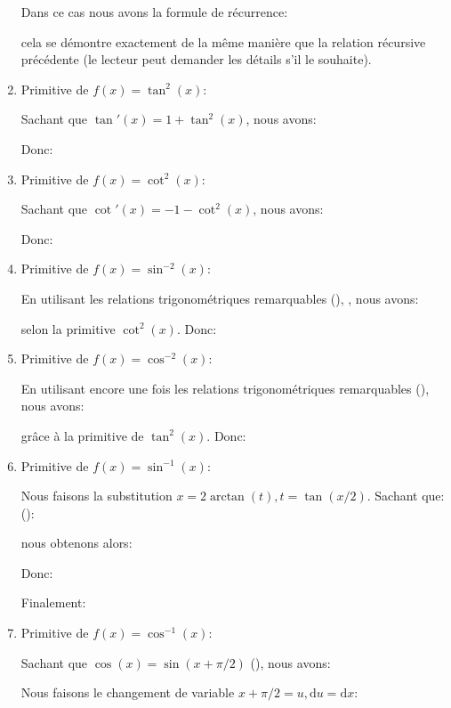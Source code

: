 \begin{enumerate}
		Dans ce cas nous avons la formule de récurrence:
		
		cela se démontre exactement de la même manière que la relation récursive précédente (le lecteur peut demander les détails s'il le souhaite).
		
		\item Primitive de $f(x)=\tan ^{2}(x)$:
		
		Sachant que $\tan'(x)=1+\tan^2(x)$, nous avons:
		
		Donc:
		
		
		\item Primitive de $f(x)=\cot ^{2}(x)$:
		
		Sachant que $\cot'(x)=-1-\cot^2(x)$, nous avons:
		
		Donc:
		
		
		\item Primitive de $f(x)=\sin ^{-2}(x)$:
		
		En utilisant les relations trigonométriques remarquables (), , nous avons: 
		
		selon la primitive $\cot^2(x)$. Donc:
		
		
		\item Primitive de $f(x)=\cos ^{-2}(x)$:
		
		En utilisant encore une fois les relations trigonométriques remarquables (), nous avons:
		
		grâce à la primitive de $\tan^2(x)$. Donc:
		
		
		\item Primitive de $f(x)=\sin^{-1}(x)$:
		
		Nous faisons la substitution $x=2\arctan(t),t=\tan(x/2)$. Sachant que: ():
		
		nous obtenons alors:
		
		Donc:
		
		Finalement:
		
		
		\item Primitive de $f(x)=\cos^{-1}(x)$:
		
		Sachant que $\cos(x)=\sin(x+\pi/2)$ (), nous avons:
		
		Nous faisons le changement de variable $x+\pi/2=u, \mathrm{d}u=\mathrm{d}x$:
		

\end{enumerate}
